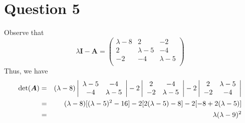 \documentclass{article}
\newcommand{\bs}[1]{\boldsymbol{#1}}
\begin{document}
\section*{Question 5}
Observe that 
$$\lambda\bs{I}-\bs{A} = \left(\begin{array}{ccc}
      \lambda-8 & 2 & -2 \\
      2 & \lambda-5 & -4\\
      -2 & -4 & \lambda-5\\
    \end{array}\right)$$
Thus, we have
\begin{eqnarray}
    \text{det}(\bs{A}) &=& (\lambda-8)\left|\begin{array}{cc}
      \lambda - 5 & -4 \\
      -4 & \lambda - 5\\
    \end{array}\right| - 2\left|\begin{array}{cc}
      2 & -4 \\
      -2 & \lambda - 5\\
    \end{array}\right|  -2\left|\begin{array}{cc}
      2 & \lambda - 5 \\
      -2 & -4\\
    \end{array}\right| \notag \\
    &=& (\lambda - 8)[(\lambda-5)^2-16] - 2[2(\lambda-5)-8]-2[-8+2(\lambda-5)] \notag\\
    &=& \lambda(\lambda - 9)^2 \notag
\end{eqnarray}
\end{document}
